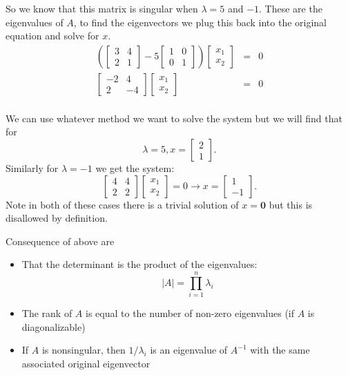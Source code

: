 So we know that this matrix is singular when $\lambda = 5$ and $-1$. 
These are the eigenvalues of $A$, to find the eigenvectors we plug this back into the original equation and solve for $x$. 
\[\begin{array}{rcl}
\left(\begin{bmatrix}3 & 4 \\ 2 & 1\end{bmatrix}-5\begin{bmatrix}1&0\\0&1\end{bmatrix}\right)\begin{bmatrix}x_1\\x_2\end{bmatrix} & = & 0\\
\begin{bmatrix}-2 & 4 \\ 2 & -4\end{bmatrix}\begin{bmatrix}x_1\\x_2\end{bmatrix} & = & 0\\
\end{array}\]

We can use whatever method we want to solve the system but we will find that for \[\lambda=5, x=\begin{bmatrix}2\\1\end{bmatrix}.\]
Similarly for $\lambda=-1$ we get the system:  
\[\begin{bmatrix}4 & 4 \\ 2 & 2\end{bmatrix}\begin{bmatrix}x_1\\x_2\end{bmatrix} = 0 \rightarrow x=\begin{bmatrix}1\\-1\end{bmatrix}.\]
Note in both of these cases there is a trivial solution of $x=\mathbf{0}$ but this is disallowed by definition. 

\begin{aside}
Consequence of above are 
\begin{itemize}
\item That the determinant is the product of the eigenvalues: \[|A|=\prod_{i=1}^n \lambda_i\]
\item The rank of $A$ is equal to the number of non-zero eigenvalues (if $A$ is diagonalizable) 
\item If $A$ is nonsingular, then $1/\lambda_i$ is an eigenvalue of $A^{-1}$ with the same associated original eigenvector
\end{itemize}
\end{aside}

